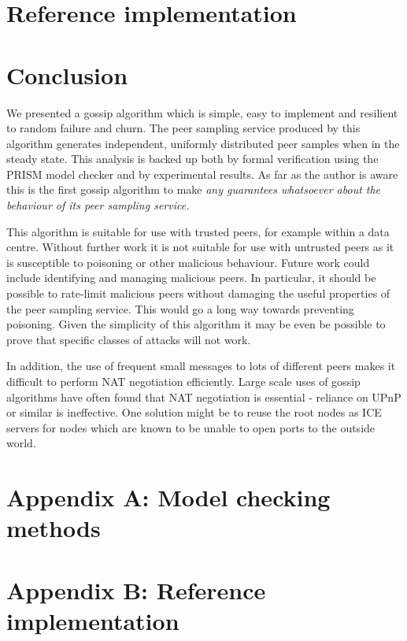 \documentclass[a4paper,10pt]{article}
\begin{document}
\section{Reference implementation}

\section{Conclusion}

We presented a gossip algorithm which is simple, easy to implement and resilient to random failure and churn. The peer sampling service produced by this algorithm generates independent, uniformly distributed peer samples when in the steady state. This analysis is backed up both by formal verification using the PRISM model checker and by experimental results. As far as the author is aware this is the first gossip algorithm to make \em any \em guarantees whatsoever about the behaviour of its peer sampling service.

This algorithm is suitable for use with trusted peers, for example within a data centre. Without further work it is not suitable for use with untrusted peers as it is susceptible to poisoning or other malicious behaviour. Future work could include identifying and managing malicious peers. In particular, it should be possible to rate-limit malicious peers without damaging the useful properties of the peer sampling service. This would go a long way towards preventing poisoning. Given the simplicity of this algorithm it may be even be possible to prove that specific classes of attacks will not work.

In addition, the use of frequent small messages to lots of different peers makes it difficult to perform NAT negotiation efficiently. Large scale uses of gossip algorithms have often found that NAT negotiation is essential - reliance on UPnP or similar is ineffective. One solution might be to reuse the root nodes as ICE servers for nodes which are known to be unable to open ports to the outside world.

\section{Appendix A: Model checking methods}

\section{Appendix B: Reference implementation}

\nocite{*}



\end{document}
